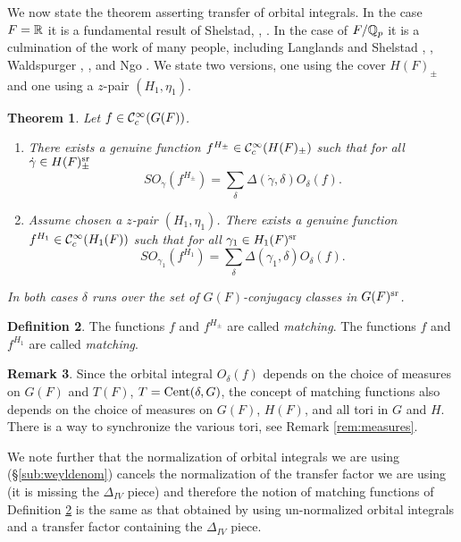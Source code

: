 \documentclass{article}
\newtheorem{thm}{Theorem}[subsection]
\theoremstyle{definition}
\newtheorem{dfn}[thm]{Definition}
\newtheorem{rem}[thm]{Remark}
\numberwithin{equation}{section}
\renewcommand{\-}{\hyp{}}
\begin{document}
We now state the theorem asserting transfer of orbital integrals. In the case $F=\mathbb{R}$ it is a fundamental result of Shelstad, \cite{She82}, \cite{SheTE1}. In the case of $F/\mathbb{Q}_p$ it is a culmination of the work of many people, including Langlands and Shelstad \cite{LS87}, \cite{LS90}, Waldspurger \cite{Wal97}, \cite{Wal06ECC}, and Ngo \cite{Ngo10}. We state two versions, one using the cover $H(F)_\pm$ and one using a $z$-pair $(H_1,\eta_1)$. 

\begin{thm} \label{thm:orbtrans}
Let $f \in \mathcal{C}_c^\infty(G(F))$.
\begin{enumerate}
	\item There exists a genuine function $f^{H_\pm} \in \mathcal{C}_c^\infty(H(F)_\pm)$ such that for all $\dot\gamma \in H(F)_\pm^{\textrm{sr}}$
	\[ SO_{\dot\gamma}(f^{H_\pm}) = \sum_\delta \Delta(\dot\gamma,\delta) O_\delta(f). \]
	\item Assume chosen a $z$-pair $(H_1,\eta_1)$. There exists a genuine function $f^{H_1} \in \mathcal{C}_c^\infty(H_1(F))$ such that for all $\gamma_1 \in H_1(F)^{\textrm{sr}}$
	\[ SO_{\gamma_1}(f^{H_1}) = \sum_\delta \Delta(\gamma_1,\delta) O_\delta(f). \]
\end{enumerate}


In both cases $\delta$ runs over the set of $G(F)$-conjugacy classes in $G(F)^{\textrm{sr}}$.
\end{thm}

\begin{dfn} \label{dfn:matching}
The functions $f$ and $f^{H_\pm}$ are called \emph{matching}. The functions $f$ and $f^{H_1}$ are called \emph{matching}.
\end{dfn}

\begin{rem} \label{rem:matchmeasures}
	Since the orbital integral $O_\delta(f)$ depends on the choice of measures on $G(F)$ and $T(F)$, $T=\textrm{Cent}(\delta,G)$, the concept of matching functions also depends on the choice of measures on $G(F)$, $H(F)$, and all tori in $G$ and $H$. There is a way to synchronize the various tori, see Remark \ref{rem:measures}.

	We note further that the normalization of orbital integrals we are using (\S\ref{sub:weyldenom}) cancels the normalization of the transfer factor we are using (it is missing the $\Delta_{IV}$ piece) and therefore the notion of matching functions of Definition \ref{dfn:matching} is the same as that obtained by using un-normalized orbital integrals and a transfer factor containing the $\Delta_{IV}$ piece.
\end{rem}
\end{document}
